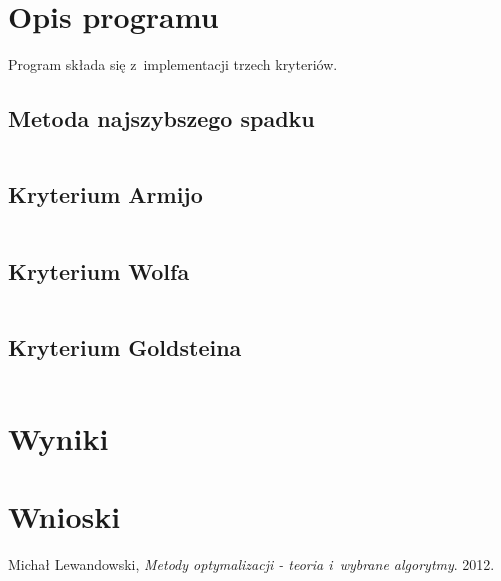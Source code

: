 \documentclass{classrep}
\begin{document}
\section{Opis programu}
Program składa się z~implementacji trzech kryteriów.

\subsection{Metoda najszybszego spadku}
\begin{lstlisting}
\end{lstlisting}

\subsection{Kryterium Armijo}
\begin{lstlisting}
\end{lstlisting}

\subsection{Kryterium Wolfa}
\begin{lstlisting}
\end{lstlisting}

\subsection{Kryterium Goldsteina}
\begin{lstlisting}
\end{lstlisting}

\section{Wyniki}
	
\section{Wnioski}

\begin{thebibliography}{9}
	Michał Lewandowski,  \emph{Metody optymalizacji - teoria i~wybrane algorytmy}.  2012.
\end{thebibliography}
\end{document}
